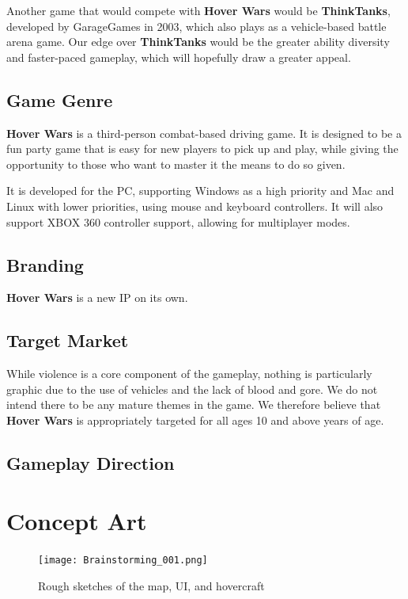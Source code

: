 \documentclass{article}
\newcommand{\namenobold}{Hover Wars}
\newcommand{\name}{\textbf{\namenobold}}
\theoremstyle{definition}
\begin{document}
Another game that would compete with \name{} would be \textbf{ThinkTanks},
developed by GarageGames in 2003, which also plays as a vehicle-based battle
arena game. Our edge over \textbf{ThinkTanks} would be the greater ability
diversity and faster-paced gameplay, which will hopefully draw a greater
appeal.

\subsection{Game Genre} %

\name{} is a third-person combat-based driving game. It is designed to be
a fun party game that is easy for new players to pick up and play, while giving
the opportunity to those who want to master it the means to do so given.

It is developed for the PC, supporting Windows as a high priority and Mac and
Linux with lower priorities, using mouse and keyboard controllers. It will also
support XBOX 360 controller support, allowing for multiplayer modes.

\subsection{Branding}

\name{} is a new IP on its own.

\subsection{Target Market}

While violence is a core component of the gameplay, nothing is particularly
graphic due to the use of vehicles and the lack of blood and gore. We do not
intend there to be any mature themes in the game. We therefore believe that
\name{} is appropriately targeted for all ages 10 and above years of age.

\subsection{Gameplay Direction} %


\section{Concept Art}

\begin{figure}[htpb]
  \centering
  \texttt{[image: Brainstorming\_001.png]}
  \caption{Rough sketches of the map, UI, and hovercraft}
\label{fig:Brainstorming_001}
\end{figure}
\end{document}
